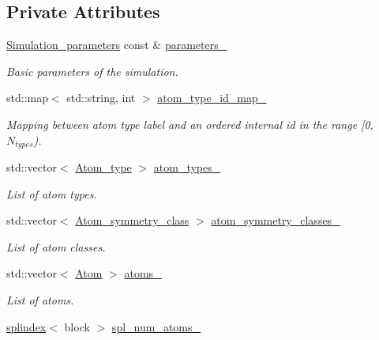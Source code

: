 \subsection*{Private Attributes}
\begin{DoxyCompactItemize}
\item 
\hyperlink{classsirius_1_1_simulation__parameters}{Simulation\+\_\+parameters} const \& \hyperlink{classsirius_1_1_unit__cell_aa6ab9c74c7627f62ce1073eba5a47eb3}{parameters\+\_\+}
\begin{DoxyCompactList}\small\item\em Basic parameters of the simulation. \end{DoxyCompactList}\item 
std\+::map$<$ std\+::string, int $>$ \hyperlink{classsirius_1_1_unit__cell_a30a032f0eef70ee7833dfc428f139abb}{atom\+\_\+type\+\_\+id\+\_\+map\+\_\+}
\begin{DoxyCompactList}\small\item\em Mapping between atom type label and an ordered internal id in the range \mbox{[}0, $ N_{types} $). \end{DoxyCompactList}\item 
std\+::vector$<$ \hyperlink{classsirius_1_1_atom__type}{Atom\+\_\+type} $>$ \hyperlink{classsirius_1_1_unit__cell_a632c9f18c76754036b15c319781a3a11}{atom\+\_\+types\+\_\+}
\begin{DoxyCompactList}\small\item\em List of atom types. \end{DoxyCompactList}\item 
std\+::vector$<$ \hyperlink{classsirius_1_1_atom__symmetry__class}{Atom\+\_\+symmetry\+\_\+class} $>$ \hyperlink{classsirius_1_1_unit__cell_a3e78840bc6c66018adaf378969a9dca5}{atom\+\_\+symmetry\+\_\+classes\+\_\+}
\begin{DoxyCompactList}\small\item\em List of atom classes. \end{DoxyCompactList}\item 
std\+::vector$<$ \hyperlink{classsirius_1_1_atom}{Atom} $>$ \hyperlink{classsirius_1_1_unit__cell_a352195243de155d84e9768cb9dd42a53}{atoms\+\_\+}
\begin{DoxyCompactList}\small\item\em List of atoms. \end{DoxyCompactList}\item 
\hyperlink{classsddk_1_1splindex}{splindex}$<$ block $>$ \hyperlink{classsirius_1_1_unit__cell_a384eb0052909c0ed468eed0685aef448}{spl\+\_\+num\+\_\+atoms\+\_\+}

\end{DoxyCompactItemize}

